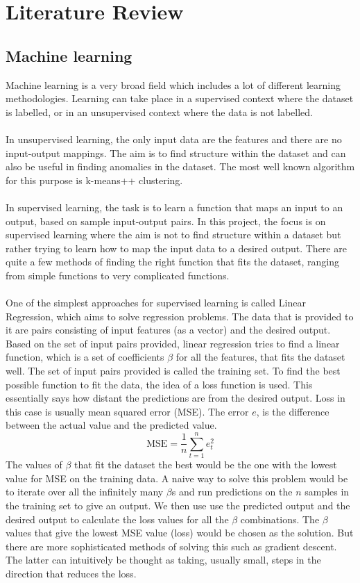 \documentclass[12pt]{article}
\begin{document}
\section{Literature Review}
\subsection{Machine learning}\label{subsec:ml}
Machine learning is a very broad field which includes a lot of different learning methodologies. Learning can take place in a supervised context where the dataset is labelled, or in an unsupervised context where the data is not labelled. 
\\\\
In unsupervised learning, the only input data are the features and there are no input-output mappings. The aim is to find structure within the dataset and can also be useful in finding anomalies in the dataset. The most well known algorithm for this purpose is k-means++ clustering.
\\\\
In supervised learning, the task is to learn a function that maps an input to an output, based on sample input-output pairs. In this project, the focus is on supervised learning where the aim is not to find structure within a dataset but rather trying to learn how to map the input data to a desired output. There are quite a few methods of finding the right function that fits the dataset, ranging from simple functions to very complicated functions.
\\\\
One of the simplest approaches for supervised learning is called Linear Regression, which aims to solve regression problems. The data that is provided to it are pairs consisting of input features (as a vector) and the desired output. Based on the set of input pairs provided, linear regression tries to find a linear function, which is a set of coefficients $\beta$ for all the features, that fits the dataset well. The set of input pairs provided is called the training set. To find the best possible function to fit the data, the idea of a loss function is used. This essentially says how distant the predictions are from the desired output. Loss in this case is usually mean squared error (MSE). The error $e$, is the difference between the actual value and the predicted value.
$$\mbox{MSE} = \frac{1}{n}\sum_{t=1}^{n}e_t^2$$
The values of $\beta$ that fit the dataset the best would be the one with the lowest value for MSE on the training data. A naive way to solve this problem would be to iterate over all the infinitely many $\beta$s and run predictions on the $n$ samples in the training set to give an output. We then use use the predicted output and the desired output to calculate the loss values for all the $\beta$ combinations. The $\beta$ values that give the lowest MSE value (loss) would be chosen as the solution. But there are more sophisticated methods of solving this such as gradient descent. The latter can intuitively be thought as taking, usually small, steps in the direction that reduces the loss. 
\end{document}
